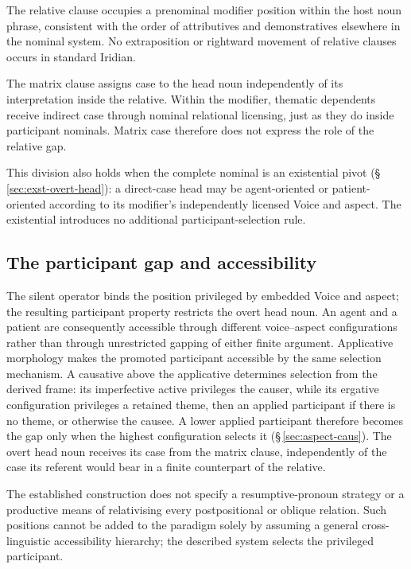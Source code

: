 The relative clause occupies a prenominal modifier position within the host
noun phrase, consistent with the order of attributives and demonstratives
elsewhere in the nominal system. No extraposition or rightward movement of
relative clauses occurs in standard Iridian.

The matrix clause assigns case to the head noun independently of its
interpretation inside the relative. Within the modifier, thematic dependents
receive indirect case through nominal relational licensing, just as they do
inside participant nominals. Matrix case therefore does not express the role
of the relative gap.

This division also holds when the complete nominal is an existential pivot
(§\,\ref{sec:exst-overt-head}): a direct-case head may be agent-oriented or
patient-oriented according to its modifier's independently licensed Voice and
aspect. The existential introduces no additional participant-selection rule.

\subsection{The participant gap and accessibility}
\label{sec:th-rel-gap}

The silent operator binds the position privileged by embedded Voice and aspect;
the resulting participant property restricts the overt head noun. An agent
and a patient are consequently accessible through different voice--aspect
configurations rather than through unrestricted gapping of either finite
argument. Applicative morphology makes the promoted participant accessible by
the same selection mechanism. A causative above the applicative determines
selection from the derived frame: its imperfective active privileges the
causer, while its ergative configuration privileges a retained theme, then an
applied participant if there is no theme, or otherwise the causee. A lower
applied participant therefore becomes the gap only when the highest
configuration selects it (§\,\ref{sec:aspect-caus}). The overt head noun
receives its case from the matrix clause, independently of the case its
referent would bear in a finite counterpart of the relative.

The established construction does not specify a resumptive-pronoun strategy
or a productive means of relativising every postpositional or oblique relation.
Such positions cannot be added to the paradigm solely by assuming a general
cross-linguistic accessibility hierarchy; the described  system
selects the privileged participant.

